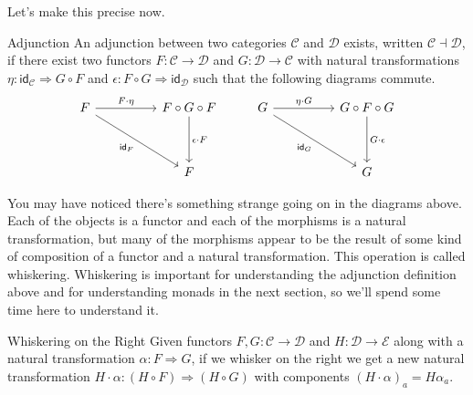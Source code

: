 \documentclass[12pt]{article}
\begin{document}
Let's make this precise now.
\begin{definition}{Adjunction}{}
    An adjunction between two categories $\mathcal{C}$ and $\mathcal{D}$ exists, written $\mathcal{C} \dashv \mathcal{D}$, if there exist two functors $F:\mathcal{C} \rightarrow \mathcal{D}$ and $G:\mathcal{D} \rightarrow \mathcal{C}$ with natural transformations $\eta : \mathsf{id}_\mathcal{C} \Rightarrow G \circ F$ and $\epsilon: F \circ G \Rightarrow \mathsf{id}_\mathcal{D}$ such that the following diagrams commute.
    \[\begin{tikzcd}
            F && {F \circ G \circ F} & G && {G \circ F \circ G} \\
            \\
            && F &&& G
            \arrow["{F \cdot \eta}", from=1-1, to=1-3]
            \arrow["{\epsilon \cdot F}", from=1-3, to=3-3]
            \arrow["{\mathsf{id}_F}"', from=1-1, to=3-3]
            \arrow["{\eta \cdot G}", from=1-4, to=1-6]
            \arrow["{G \cdot \epsilon}", from=1-6, to=3-6]
            \arrow["{\mathsf{id}_G}"', from=1-4, to=3-6]
        \end{tikzcd}\]
\end{definition}
You may have noticed there's something strange going on in the diagrams above.
Each of the objects is a functor and each of the morphisms is a natural transformation, but many of the morphisms appear to be the result of some kind of composition of a functor and a natural transformation.
This operation is called whiskering.
Whiskering is important for understanding the adjunction definition above and for understanding monads in the next section, so we'll spend some time here to understand it.
\begin{definition}{Whiskering on the Right}{}
    Given functors $F,G: \mathcal{C} \rightarrow \mathcal{D}$ and $H:\mathcal{D} \rightarrow \mathcal{E}$ along with a natural transformation $\alpha:F \Rightarrow G$, if we whisker on the right we get a new natural transformation $H\cdot\alpha : (H \circ F) \Rightarrow (H \circ G)$ with components $(H\cdot\alpha)_a=H\alpha_a$.
\end{definition}
\end{document}
